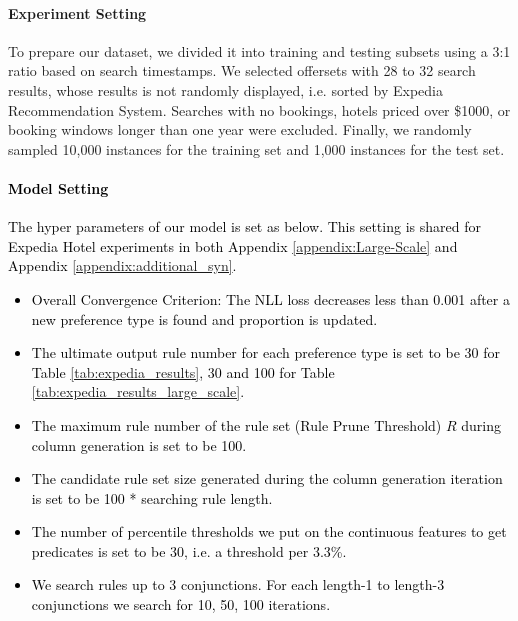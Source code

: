 \documentclass{article} %
\begin{document}
\paragraph{Experiment Setting}
To prepare our dataset, we divided it into training and testing subsets using a 3:1 ratio based on search timestamps. We selected offersets with 28 to 32 search results, whose results is not randomly displayed, i.e. sorted by Expedia Recommendation System. Searches with no bookings, hotels priced over \$1000, or booking windows longer than one year were excluded. Finally, we randomly sampled 10,000 instances for the training set and 1,000 instances for the test set. 

\textcolor{black}{
\paragraph{Model Setting}
The hyper parameters of our model is set as below. This setting is shared for Expedia Hotel experiments in both Appendix \ref{appendix:Large-Scale} and Appendix \ref{appendix:additional_syn}.
\begin{itemize}
    \item Overall Convergence Criterion: The NLL loss decreases less than 0.001 after a new preference type is found and proportion is updated. 
    \item The ultimate output rule number for each preference type is set to be 30 for Table \ref{tab:expedia_results}, 30 and 100 for Table \ref{tab:expedia_results_large_scale}.
    \item The maximum rule number of the rule set (Rule Prune Threshold) $R$ during column generation is set to be 100.
    \item The candidate rule set size generated during the column generation iteration is set to be 100 * searching rule length.
    \item The number of percentile thresholds we put on the continuous features to get predicates is set to be 30, i.e. a threshold per 3.3\%.
    \item We search rules up to 3 conjunctions. For each length-1 to length-3 conjunctions we search for 10, 50, 100 iterations.
\end{itemize}
}
\end{document}
